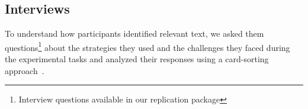 


\subsection{Interviews}
\label{cp3:interviews}

To understand how participants identified relevant text, we asked them questions\footnote{Interview questions available in our replication package} about the strategies they used and the challenges they faced during the experimental tasks and analyzed their responses using a card-sorting approach~\cite{spencer2009sorting}.




